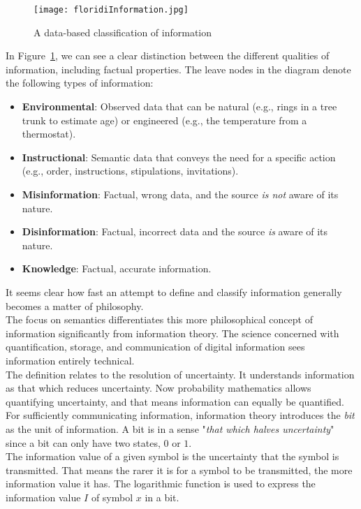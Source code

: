 \begin{figure}
	\centering
	\texttt{[image: floridiInformation.jpg]}
	\caption{A data-based classification of information~\cite{Floridi2009}}
	\label{fig:floridiInformation}
\end{figure}
In Figure~\ref{fig:floridiInformation}, we can see a clear distinction between the different qualities of information, including factual properties. The leave nodes in the diagram denote the following types of information:
\begin{itemize}
	\item \textbf{Environmental}: Observed data that can be natural (e.g., rings in a tree trunk to estimate age) or engineered (e.g., the temperature from a thermostat).
	\item \textbf{Instructional}: Semantic data that conveys the need for a specific action (e.g., order, instructions, stipulations, invitations).
	\item \textbf{Misinformation}: Factual, wrong data, and the source \textit{is not} aware of its nature.
	\item \textbf{Disinformation}: Factual, incorrect data and the source \textit{is} aware of its nature.
	\item \textbf{Knowledge}: Factual, accurate information.
\end{itemize}
It seems clear how fast an attempt to define and classify information generally becomes a matter of philosophy.~\cite{Floridi2009}\\
The focus on semantics differentiates this more philosophical concept of information significantly from information theory. The science concerned with quantification, storage, and communication of digital information sees information entirely technical.\\
The definition relates to the resolution of uncertainty. It understands information as that which reduces uncertainty. Now probability mathematics allows quantifying uncertainty, and that means information can equally be quantified. For sufficiently communicating information, information theory introduces the \textit{bit} as the unit of information. A bit is in a sense "\textit{that which halves uncertainty}" since a bit can only have two states, $0$ or $1$.~\cite{Shannon1948}\\
The information value of a given symbol is the uncertainty that the symbol is transmitted. That means the rarer it is for a symbol to be transmitted, the more information value it has. The logarithmic function is used to express the information value $I$ of symbol $x$ in a bit.
